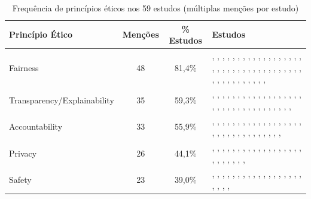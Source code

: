 \begin{table}[htbp]
\centering
\caption{Frequência de princípios éticos nos 59 estudos (múltiplas menções por estudo)}
\label{tab:principles}
\scriptsize
\begin{tabular}{lccp{6.5cm}}
\hline
\textbf{Princípio Ético} & \textbf{Menções} & \textbf{\% Estudos} & \textbf{Estudos} \\
\hline
Fairness & 48 & 81,4\% & \cite{S001}, \cite{S003}, \cite{S004}, \cite{S006}, \cite{S008}, \cite{S010}, \cite{S011}, \cite{S012}, \cite{S013}, \cite{S014}, \cite{S015}, \cite{S016}, \cite{S017}, \cite{S019}, \cite{S020}, \cite{S021}, \cite{S022}, \cite{S023}, \cite{S024}, \cite{S028}, \cite{S029}, \cite{S030}, \cite{S031}, \cite{S032}, \cite{S033}, \cite{S034}, \cite{S035}, \cite{S036}, \cite{S037}, \cite{S038}, \cite{S039}, \cite{S040}, \cite{S041}, \cite{S042}, \cite{S044}, \cite{S045}, \cite{S046}, \cite{S048}, \cite{S049}, \cite{S050}, \cite{S052}, \cite{S053}, \cite{S054}, \cite{S055}, \cite{S056}, \cite{S057}, \cite{S058}, \cite{S059} \\
\hline
Transparency/Explainability & 35 & 59,3\% & \cite{S001}, \cite{S002}, \cite{S003}, \cite{S006}, \cite{S007}, \cite{S010}, \cite{S011}, \cite{S012}, \cite{S013}, \cite{S014}, \cite{S015}, \cite{S016}, \cite{S018}, \cite{S021}, \cite{S023}, \cite{S024}, \cite{S025}, \cite{S028}, \cite{S029}, \cite{S033}, \cite{S037}, \cite{S038}, \cite{S039}, \cite{S041}, \cite{S042}, \cite{S043}, \cite{S044}, \cite{S046}, \cite{S048}, \cite{S050}, \cite{S051}, \cite{S053}, \cite{S055}, \cite{S056}, \cite{S058} \\
\hline
Accountability & 33 & 55,9\% & \cite{S001}, \cite{S005}, \cite{S006}, \cite{S009}, \cite{S012}, \cite{S013}, \cite{S014}, \cite{S016}, \cite{S018}, \cite{S019}, \cite{S023}, \cite{S025}, \cite{S027}, \cite{S028}, \cite{S029}, \cite{S033}, \cite{S035}, \cite{S037}, \cite{S038}, \cite{S039}, \cite{S041}, \cite{S042}, \cite{S043}, \cite{S044}, \cite{S046}, \cite{S048}, \cite{S049}, \cite{S050}, \cite{S051}, \cite{S053}, \cite{S055}, \cite{S056}, \cite{S058} \\
\hline
Privacy & 26 & 44,1\% & \cite{S001}, \cite{S002}, \cite{S003}, \cite{S005}, \cite{S006}, \cite{S009}, \cite{S012}, \cite{S014}, \cite{S016}, \cite{S017}, \cite{S023}, \cite{S024}, \cite{S028}, \cite{S029}, \cite{S031}, \cite{S033}, \cite{S037}, \cite{S038}, \cite{S039}, \cite{S041}, \cite{S042}, \cite{S044}, \cite{S048}, \cite{S056}, \cite{S058}, \cite{S059} \\
\hline
Safety & 23 & 39,0\% & \cite{S001}, \cite{S005}, \cite{S006}, \cite{S007}, \cite{S008}, \cite{S009}, \cite{S012}, \cite{S014}, \cite{S016}, \cite{S019}, \cite{S023}, \cite{S027}, \cite{S028}, \cite{S029}, \cite{S031}, \cite{S033}, \cite{S039}, \cite{S042}, \cite{S043}, \cite{S047}, \cite{S051}, \cite{S056}, \cite{S058} \\

\end{tabular}
\end{table}
